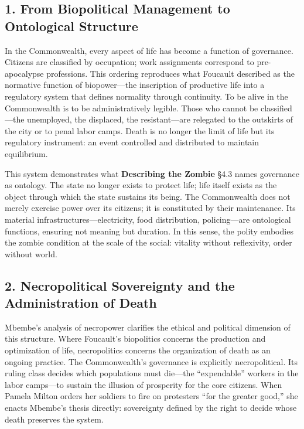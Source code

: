 \documentclass[11pt]{article}
\begin{document}
\subsection*{1. From Biopolitical Management to Ontological Structure}
\label{sec:orgfef1696}

In the Commonwealth, every aspect of life has become a function of governance.  Citizens are classified by occupation; work assignments correspond to pre-apocalypse professions.  This ordering reproduces what Foucault described as the normative function of biopower—the inscription of productive life into a regulatory system that defines normality through continuity.  To be alive in the Commonwealth is to be administratively legible.  Those who cannot be classified—the unemployed, the displaced, the resistant—are relegated to the outskirts of the city or to penal labor camps.  Death is no longer the limit of life but its regulatory instrument: an event controlled and distributed to maintain equilibrium.  

This system demonstrates what \textbf{Describing the Zombie} §4.3 names governance as ontology.  The state no longer exists to protect life; life itself exists as the object through which the state sustains its being.  The Commonwealth does not merely exercise power over its citizens; it is constituted by their maintenance.  Its material infrastructures—electricity, food distribution, policing—are ontological functions, ensuring not meaning but duration.  In this sense, the polity embodies the zombie condition at the scale of the social: vitality without reflexivity, order without world.
\subsection*{2. Necropolitical Sovereignty and the Administration of Death}
\label{sec:org4ec760f}

Mbembe’s analysis of necropower clarifies the ethical and political dimension of this structure.  Where Foucault’s biopolitics concerns the production and optimization of life, necropolitics concerns the organization of death as an ongoing practice.  The Commonwealth’s governance is explicitly necropolitical.  Its ruling class decides which populations must die—the “expendable” workers in the labor camps—to sustain the illusion of prosperity for the core citizens.  When Pamela Milton orders her soldiers to fire on protesters “for the greater good,” she enacts Mbembe’s thesis directly: sovereignty defined by the right to decide whose death preserves the system.  
\end{document}
